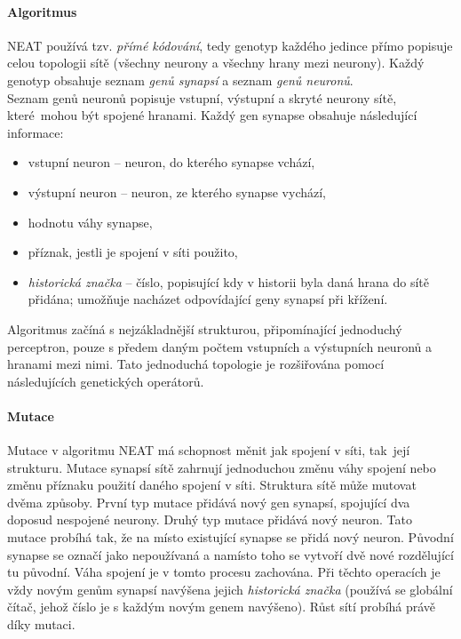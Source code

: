 \paragraph{Algoritmus}
NEAT používá tzv. \emph{přímé kódování}, tedy genotyp každého jedince přímo
popisuje celou topologii sítě (všechny neurony a všechny hrany mezi neurony).
Každý genotyp obsahuje seznam \emph{genů synapsí} a seznam \emph{genů neuronů}.
\\Seznam genů neuronů popisuje vstupní, výstupní a skryté neurony sítě,
které~mohou být spojené hranami. Každý gen synapse obsahuje následující
informace: 
\begin{itemize}
    \item vstupní neuron -- neuron, do kterého synapse vchází,
    \item výstupní neuron -- neuron, ze kterého synapse vychází,
    \item hodnotu váhy synapse,
    \item příznak, jestli je spojení v síti použito,
    \item \emph{historická značka} -- číslo, popisující kdy v historii
        byla daná hrana do sítě přidána; umožňuje nacházet
        odpovídající geny synapsí při křížení.
\end{itemize}
Algoritmus začíná s nejzákladnější strukturou, připomínající jednoduchý
perceptron, pouze s předem daným počtem vstupních a výstupních neuronů a
hranami mezi nimi. Tato jednoduchá topologie je rozšiřována pomocí
následujících genetických operátorů.

\paragraph{Mutace}
Mutace v algoritmu NEAT má schopnost měnit jak spojení v síti, tak~její
strukturu. Mutace synapsí sítě zahrnují jednoduchou změnu váhy spojení nebo
změnu příznaku použití daného spojení v síti. Struktura sítě může mutovat
dvěma způsoby. První typ mutace přidává nový gen synapsí, spojující dva doposud
nespojené neurony. Druhý typ mutace přidává nový neuron. Tato mutace probíhá
tak, že na místo existující synapse se přidá nový neuron. Původní synapse se
označí jako nepoužívaná a namísto toho se vytvoří dvě nové rozdělující tu
původní. Váha spojení je v tomto procesu zachována. Při těchto operacích je
vždy novým genům synapsí navýšena jejich \emph{historická značka} (používá se
globální čítač, jehož číslo je s každým novým genem navýšeno). Růst
sítí probíhá právě díky mutaci.

